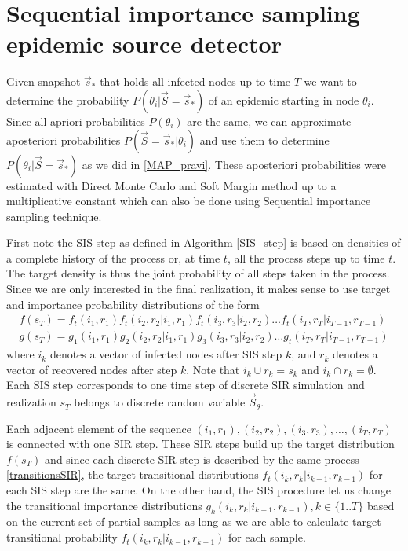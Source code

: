 \documentclass[times, utf8, diplomski]{fer}
\begin{document}
\section{Sequential importance sampling epidemic source detector}
Given snapshot $\vec s_*$ that holds all infected nodes up to time $T$ we want to determine the probability $P(\theta_i | \vec S = \vec s_*)$ of an epidemic starting in node $\theta_i$. Since all apriori probabilities $P(\theta_i)$ are the same, we can approximate aposteriori probabilities $P(\vec S = \vec s_* | \theta_i)$ and use them to determine $P(\theta_i | \vec S = \vec s_*)$ as we did in \ref{MAP_pravi}. These aposteriori probabilities were estimated with Direct Monte Carlo and Soft Margin method up to a multiplicative constant which can also be done using Sequential importance sampling technique.

First note the SIS step as defined in Algorithm \ref{SIS_step} is based on densities of a complete history of the process or, at time $t$, all the process steps up to time $t$. The target density is thus the joint probability of all steps taken in the process. Since we are only interested  in the final realization, it makes sense to use target and importance probability distributions  of the form
\begin{equation}
\begin{aligned}
f(s_T) = f_t(i_1, r_1) f_t(i_2, r_2 | i_1, r_1)  f_t(i_3, r_3 | i_2, r_2)  \ldots  f_t(i_T, r_T | i_{T - 1}, r_{T - 1})\\
g(s_T) = g_1(i_1, r_1) g_2(i_2, r_2 | i_1, r_1) g_3(i_3, r_3 | i_2, r_2) \ldots  g_t(i_T, r_T | i_{T - 1}, r_{T - 1})
\end{aligned}
\end{equation}
where $i_k$ denotes a vector of infected nodes after SIS step $k$, and $r_k$ denotes a vector of recovered nodes after step $k$. Note that $i_k \cup r_k = s_k$ and $i_k \cap r_k = \emptyset$.
Each SIS step corresponds to one time step of discrete SIR simulation and 
realization $s_T$ belongs to discrete random variable $\vec S_\theta$.  

Each adjacent element of the sequence $(i_1, r_1), (i_2, r_2), (i_3, r_3), \ldots, (i_T, r_T)$ is connected with one SIR step. These SIR steps build up the target distribution $f(s_T)$ and since each discrete SIR step is described by the same process \ref{transitionsSIR}, the target transitional distributions $f_t(i_k, r_k | i_{k - 1}, r_{k - 1})$ for each SIS step are the same. On the other hand, the SIS procedure let us change the transitional importance distributions $g_k(i_k, r_k | i_{k - 1}, r_{k - 1}), k \in \{1..T\}$ based on the current set of partial samples as long as we are able to calculate target transitional probability $f_t(i_k, r_k | i_{k - 1}, r_{k - 1})$ for each sample.
\end{document}
